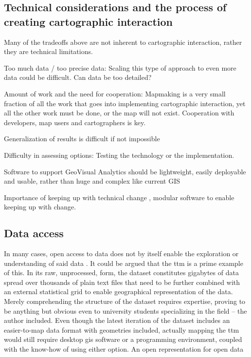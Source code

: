 \subsection{Technical considerations and the process of creating cartographic interaction}

Many of the tradeoffs above are not inherent to cartographic interaction,
rather they are technical limitations.

Too much data / too precise data:
Scaling this type of approach to even more data could be difficult.
Can data be too detailed?

Amount of work and the need for cooperation:
Mapmaking is a very small fraction of all the work
that goes into implementing cartographic interaction,
yet all the other work must be done,
or the map will not exist.
Cooperation with developers, map users and cartographers is key.

Generalization of results is difficult if not impossible

Difficulty in assessing options: Testing the technology or the implementation.

Software to support GeoVisual Analytics should be lightweight, easily %
deployable and usable, rather than huge and complex like current GIS

Importance of keeping up with technical change \parencite{rot2014},
modular software to enable keeping up with change.


\subsection{Data access}


In many cases, open access to data does not by itself enable
the exploration or understanding of said data \parencite{obr2016}.
It could be argued that the \acrshort{ttm} is a prime example of this.
In its raw, unprocessed, form,
the dataset constitutes gigabytes of data spread over thousands of plain text files
that need to be further combined with an external statistical grid to enable
geographical representation of the data.
Merely comprehending the structure of the dataset requires expertise,
proving to be anything but obvious even to university students specializing in the field
-- the author included.
Even though the latest iteration of the dataset \parencite{fin2023}
includes an easier-to-map data format with geometries included,
actually mapping the \acrshort{ttm} would still require
desktop \acrshort{gis} software or a programming environment,
coupled with the know-how of using either option.
An open representation for open data

